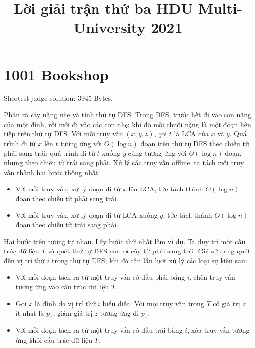 \documentclass[11pt]{article}
\title{Lời giải trận thứ ba HDU Multi-University 2021}
\author{}
\date{}
\begin{document}
\maketitle


\section{1001 Bookshop}

Shortest judge solution: 3945 Bytes.

Phân rã cây nặng nhẹ và tính thứ tự DFS. Trong DFS, trước hết đi vào con
nặng của một đỉnh, rồi mới đi vào các con nhẹ; khi đó mỗi chuỗi nặng là một
đoạn liên tiếp trên thứ tự DFS. Với mỗi truy vấn $(x,y,z)$, gọi $t$ là LCA
của $x$ và $y$. Quá trình đi từ $x$ lên $t$ tương ứng với $O(\log n)$ đoạn
trên thứ tự DFS theo chiều từ phải sang trái; quá trình đi từ $t$ xuống $y$
cũng tương ứng với $O(\log n)$ đoạn, nhưng theo chiều từ trái sang phải. Xử
lý các truy vấn offline, ta tách mỗi truy vấn thành hai bước thống nhất:

\begin{itemize}
  \item Với mỗi truy vấn, xử lý đoạn đi từ $x$ lên LCA, tức tách thành
  $O(\log n)$ đoạn theo chiều từ phải sang trái.
  \item Với mỗi truy vấn, xử lý đoạn đi từ LCA xuống $y$, tức tách thành
  $O(\log n)$ đoạn theo chiều từ trái sang phải.
\end{itemize}

Hai bước trên tương tự nhau. Lấy bước thứ nhất làm ví dụ. Ta duy trì một cấu
trúc dữ liệu $T$ và quét thứ tự DFS của cả cây từ phải sang trái. Giả sử đang
quét đến vị trí thứ $i$ trong thứ tự DFS; khi đó cần lần lượt xử lý các loại
sự kiện sau:

\begin{itemize}
  \item Với mỗi đoạn tách ra từ một truy vấn có đầu phải bằng $i$, chèn truy
  vấn tương ứng vào cấu trúc dữ liệu $T$.
  \item Gọi $x$ là đỉnh do vị trí thứ $i$ biểu diễn. Với mọi truy vấn trong
  $T$ có giá trị $z$ ít nhất là $p_x$, giảm giá trị $z$ tương ứng đi $p_x$.
  \item Với mỗi đoạn tách ra từ một truy vấn có đầu trái bằng $i$, xóa truy
  vấn tương ứng khỏi cấu trúc dữ liệu $T$.
\end{itemize}
\end{document}
